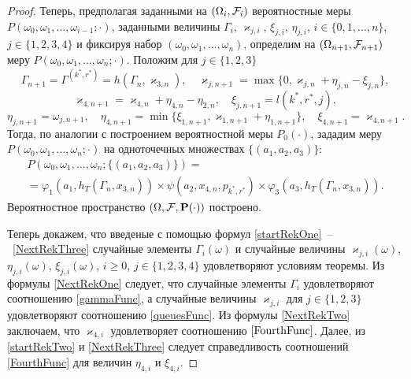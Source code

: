 \documentclass[a4paper,12pt,russian]{extarticle}
\newcommand{\ga}[1]{\Gamma^{\left( #1 \right)} }
\newcommand{\ml}[1]{\begin{multline}#1\end{multline}}
\begin{document}
\begin{proof}
Теперь, предполагая заданными на $(\Omega_i, {\cal F}_i)$ вероятностные меры $P(\omega_0, \omega_1, \ldots, \omega_{i-1};\cdot)$, заданными величины $\Gamma_i$, $\varkappa_{j,i}$, $\xi_{j,i}$, $\eta_{j,i}$, $i\in \{0,1,\ldots,n\}$, $j\in \{1, 2, 3, 4\}$ и фиксируя набор $(\omega_0, \omega_1, \ldots, \omega_{n})$, определим на $(\Omega_{n+1}, {\cal F}_{n+1})$ меру $P(\omega_0, \omega_1, \ldots, \omega_n;\cdot)$. Положим для $j\in \{1, 2, 3\}$
\begin{equation}
\Gamma_{n+1}=\ga{k^*,r^*}=h(\Gamma_{n},\varkappa_{3,n}), \quad \varkappa_{j,n+1}=\max\{ 0,\varkappa_{j,n}+\eta_{j,n} -\xi_{j,n}\},
\label{NextRekOne}
\end{equation}
\begin{equation}
\varkappa_{4,n+1}=\varkappa_{4,n}+\eta_{4,n}-\eta_{2,n}, \quad \xi_{j,n+1}=l(k^*,r^*,j),
\label{NextRekTwo}
\end{equation}
\begin{equation}
\eta_{j,n+1}=\omega_{j,n+1}, \quad \eta_{4,n+1}=\min\{\xi_{1,n+1}, \varkappa_{1,n+1}+\eta_{1,n+1}\}, \quad \xi_{4,n+1}=\varkappa_{4,n+1}.
\label{NextRekThree}
\end{equation}
Тогда, по аналогии с построением вероятностной меры $P_0(\cdot)$, зададим меру $P(\omega_0,\omega_1,\ldots,\omega_n;\cdot)$ на одноточечных множествах $\{(a_1,a_2,a_3)\}$:
\ml
{
P(\omega_0,\omega_1,\ldots,\omega_n;\{(a_1,a_2,a_3)\}) = \\
= \varphi_1(a_1,h_T(\Gamma_n,x_{3,n})) \times \psi(a_2,x_{4,n}, p_{k^*,r^*}) \times \varphi_3(a_3,h_T(\Gamma_n,x_{3,n})).
\label{probabilitiesTwo}
}
Вероятностное пространство $(\Omega,{\cal F},\Pr(\cdot))$ построено. 

Теперь докажем, что введеные с помощью формул \eqref{startRekOne}~--~\eqref{NextRekThree} случайные элементы $\Gamma_i(\omega)$ и случайные величины $\varkappa_{j,i}(\omega)$, $\eta_{j,i}(\omega)$, $\xi_{j,i}(\omega)$, $i \geqslant 0$, $j \in \{1, 2, 3, 4\}$ удовлетворяют условиям теоремы. Из формулы \eqref{NextRekOne} следует, что случайные элементы $\Gamma_i$ удовлетворяют соотношению \eqref{gammaFunc}, а случайные величины $\varkappa_{j,i}$ для $j\in \{1, 2, 3\}$ удовлетворяют соотношению \eqref{queuesFunc}. Из формулы \eqref{NextRekTwo} заключаем, что $\varkappa_{4,i}$ удовлетворяет соотношению $\eqref{FourthFunc}$. Далее, из \eqref{startRekTwo} и \eqref{NextRekThree} следует справедливость соотношений \eqref{FourthFunc} для величин $\eta_{4,i}$ и $\xi_{4,i}$. 


\end{proof}
\end{document}
